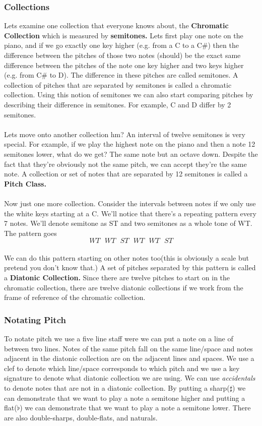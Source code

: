 \documentclass{article}
\begin{document}
\subsubsection{Collections}
Lets examine one collection that everyone knows about, the \textbf{Chromatic Collection} which is measured by \textbf{semitones.} Lets first play one note on the piano, and if we go exactly one key higher (e.g. from a C to a C\#) then the difference between the pitches of those two notes (should) be the exact same difference between the pitches of the note one key higher and two keys higher (e.g. from C\# to D). The difference in these pitches are called semitones. A collection of pitches that are separated by semitones is called a chromatic collection. Using this notion of semitones we can also start comparing pitches by describing their difference in semitones. For example, C and D differ by 2 semitones.\\\\Lets move onto another collection hm? An interval of twelve semitones is very special. For example, if we play the highest note on the piano and then a note 12 semitones lower, what do we get? The same note but an octave down. Despite the fact that they're obviously not the same pitch, we can accept they're the same note. A collection or set of notes that are separated by 12 semitones is called a \textbf{Pitch Class.}\\\\
Now just one more collection. Consider the intervals between notes if we only use the white keys starting at a C. We'll notice that there's a repeating pattern every 7 notes. We'll denote semitone as ST and two semitones as a whole tone of WT. The pattern goes \\$$WT\text{ }WT \text{ }ST \text{ }WT \text{ }WT \text{ }ST$$\\We can do this pattern starting on other notes too(this is obviously a scale but pretend you don't know that.) A set of pitches separated by this pattern is called a \textbf{Diatonic Collection.} Since there are twelve pitches to start on in the chromatic collection, there are twelve diatonic collections if we work from the frame of reference of the chromatic collection.
\subsubsection{Notating Pitch}
To notate pitch we use a five line staff were we can put a note on a line of between two lines. Notes of the same pitch fall on the same line/space and notes adjacent in the diatonic collection are on the adjacent lines and spaces. We use a clef to denote which line/space corresponds to which pitch and we use a key signature to denote what diatonic collection we are using. We can use \textit{accidentals} to denote notes that are not in a diatonic collection. By putting a sharp($\sharp$) we can demonstrate that we want to play a note a semitone higher and putting a flat($\flat$) we can demonstrate that we want to play a note a semitone lower. There are also double-sharps, double-flats, and naturals.
\end{document}
